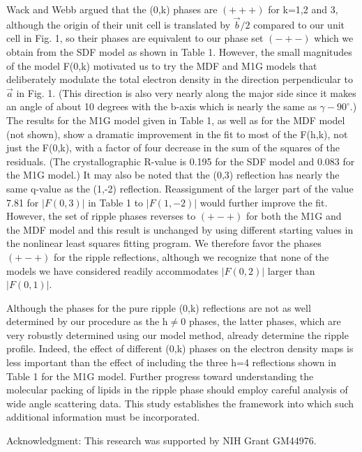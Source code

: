 Wack and Webb \cite{Wac89a} argued that the (0,k) phases are $(+++)$ for 
k=1,2 and 3,
although the origin of their unit cell is translated by $\vec{b}/2$
compared to our unit cell in Fig. 1, so their
phases are equivalent to our phase set $(-+-)$ which we obtain
from the SDF model as shown in Table 1.  However, the small magnitudes
of the model F(0,k) motivated us to try the MDF and M1G models that
deliberately modulate the total electron density in the direction 
perpendicular to $\vec{a}$ in Fig. 1.  (This direction is also very nearly
along the major side since it makes an angle of about 10 degrees
with the b-axis which is nearly the same as $\gamma - 90^{\circ}$.)
The results for the M1G model given in Table 1, as well as for
the MDF model (not shown), show a dramatic
improvement in the fit to most of the F(h,k), not just the F(0,k), with
a factor of four decrease in the sum of the squares of the residuals.
(The crystallographic R-value is 0.195 for the SDF model and 
0.083 for the M1G model.)  It may also be noted that the (0,3) reflection 
has nearly the same q-value as the (1,-2) reflection.  Reassignment of the 
larger part of the value 7.81 for $|F(0,3)|$ in Table 1 to $|F(1,-2)|$ would
further improve the fit.
However, the set of ripple phases reverses to $(+-+)$ for both the M1G and
the MDF model and this result is
unchanged by using different starting values in the nonlinear
least squares fitting program.   We therefore favor the phases $(+-+)$
for the ripple reflections, although we recognize that none of
the models we have considered readily accommodates $|F(0,2)|$ larger
than $|F(0,1)|$.

Although the phases for the pure ripple (0,k) reflections
are not as well determined by our procedure as the h$\neq$0 phases,
the latter phases, which are very robustly determined using
our model method, already determine the ripple profile.  
Indeed, the effect of different (0,k) phases on the electron density
maps is less important than the effect of including the three h=4 
reflections shown in Table 1 for the M1G model.
Further progress toward understanding the molecular packing of lipids in the 
ripple phase should employ careful analysis of wide angle scattering data.
This study establishes the framework into which such additional information
must be incorporated.

Acknowledgment: This research was supported by NIH Grant GM44976.

